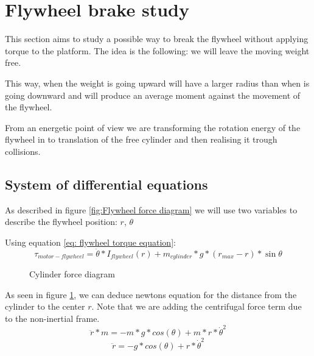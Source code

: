 \section{Flywheel brake study}

This section aims to study a possible way to break the flywheel without applying torque to the platform. The idea is the following: we will leave the moving weight free.

This way, when the weight is going upward will have a larger radius than when is going downward and will produce an average moment against the movement of the flywheel.

From an energetic point of view we are transforming the rotation energy of the flywheel in to translation of the free cylinder and then realising it trough collisions.
\subsection{System of differential equations}
As described in figure \ref{fig:Flywheel force diagram} we will use two variables to describe the flywheel position: $r$, $\theta$ 

Using equation \ref{eq: flywheel torque equation}:
\[\tau_{motor-flywheel} = \ddot{\theta}*I_{flywheel}(r) + m_{cylinder} * g * (r_{max} - r) * \sin{\theta}  \]
\begin{figure}[H]
	\centering
	\caption{Cylinder force diagram}
	\label{fig:Cylinder force diagram}
\end{figure}

As seen in figure \ref{fig:Cylinder force diagram}, we can deduce newtons equation for the distance from the cylinder to the center $r$. Note that we are adding the centrifugal force term due to the non-inertial frame.
\[\ddot{r} * m = -m * g * cos(\theta) + m * r * \dot{\theta}^2 \]
\[\ddot{r} = -g * cos(\theta) + r * \dot{\theta}^2 \]

